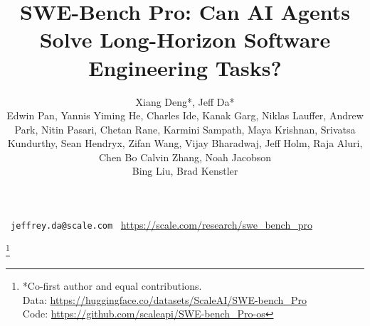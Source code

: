 \documentclass[12pt]{scaleai-paper}
\title{SWE-Bench Pro: Can AI Agents Solve Long-Horizon Software Engineering Tasks?}%
\author{Xiang Deng*, Jeff Da*\\Edwin Pan, Yannis Yiming He, Charles Ide, Kanak Garg, Niklas Lauffer, Andrew Park, Nitin Pasari, Chetan Rane, Karmini Sampath, Maya Krishnan, Srivatsa Kundurthy, Sean Hendryx, Zifan Wang, Vijay Bharadwaj, Jeff Holm, Raja Aluri, Chen Bo Calvin Zhang, Noah Jacobson\\Bing Liu, Brad Kenstler}
\affil{Scale AI}
\makeatletter
\newcommand\blfootnote[1]{
    \begingroup
    \renewcommand\thefootnote{}\footnote{#1}
    \addtocounter{footnote}{-1}
    \endgroup
}
\newcommand{\authoremail}{%
  \vspace{-1.5em}
    \faEnvelope\  \texttt{jeffrey.da@scale.com} \quad 
    \faGlobe\  \url{https://scale.com/research/swe_bench_pro}
}
\makeatother
\begin{document}
\newcommand*\circled[1]{\tikz[baseline=(char.base)]{
            \node[shape=circle,draw,inner sep=1pt] (char) {#1};}}
\newcommand{\watermarktext}{\textbf{Warning: Potentially Harmful Content}}
\newcommand\watermark{%
  \begin{tikzpicture}[remember picture,overlay,scale=3]
    \node[
    rotate=60,
    scale=3,
    opacity=0.3,
    color=red,
    inner sep=0pt
    ]
    at (current page.center) []
    {\watermarktext};
\end{tikzpicture}}%

\newcommand{\jeff}[1]{\textcolor{blue}{Jeff: #1}}
\newcommand{\yannis}[1]{\textcolor{orange}{Yannis: #1}}
\newcommand{\sail}[1]{\textcolor{orange}{Sail: #1}}
\newcommand{\sri}[1]{\textcolor{blue}{Sri: #1}}

\maketitle

\authoremail

\blfootnote{*Co-first author and equal contributions.\\Data: \url{https://huggingface.co/datasets/ScaleAI/SWE-bench\_Pro}\\Code: \url{https://github.com/scaleapi/SWE-bench\_Pro-os}}










\newpage






\appendix

\end{document}
